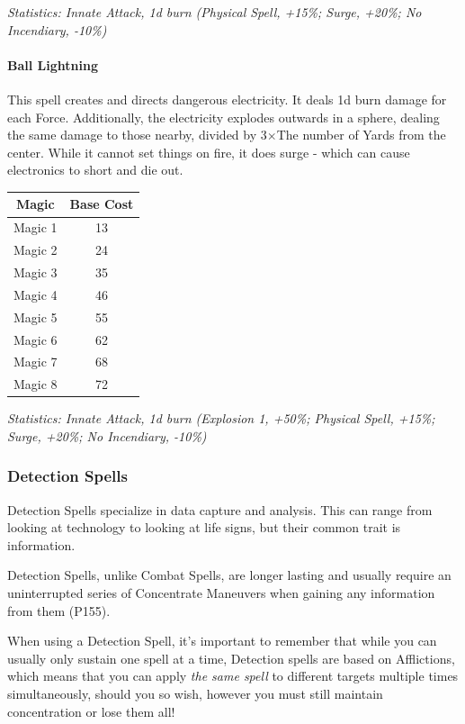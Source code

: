 \begin{multicols}{3}
	\textcolor{OliveGreen}{\textit{Statistics: Innate Attack, 1d burn (Physical Spell, +15\%; Surge, +20\%; No Incendiary, -10\%)}}
	
	\paragraph{Ball Lightning}
	
	This spell creates and directs dangerous electricity. It deals 1d burn damage for each Force. Additionally, the electricity explodes outwards in a sphere, dealing the same damage to those nearby, divided by 3\(\times\)The number of Yards from the center. While it cannot set things on fire, it does surge - which can cause electronics to short and die out.
	
	\begin{center}
		\begin{tabular}{|c|c|}
			\hline
			Magic & Base Cost \\
			\hline
			\hline
			Magic 1 & 13 \\
			Magic 2 & 24 \\
			Magic 3 & 35 \\
			Magic 4 & 46 \\
			Magic 5 & 55 \\
			Magic 6 & 62 \\
			Magic 7 & 68 \\
			Magic 8 & 72 \\
			\hline
		\end{tabular}
	\end{center}
	
	\textcolor{OliveGreen}{\textit{Statistics: Innate Attack, 1d burn (Explosion 1, +50\%; Physical Spell, +15\%; Surge, +20\%; No Incendiary, -10\%)}}
	
	\subsubsection{Detection Spells}
	
	Detection Spells specialize in data capture and analysis. This can range from looking at technology to looking at life signs, but their common trait is information.
	
	Detection Spells, unlike Combat Spells, are longer lasting and usually require an uninterrupted series of Concentrate Maneuvers when gaining any information from them (P155).
	
	When using a Detection Spell, it's important to remember that while you can usually only sustain one spell at a time, Detection spells are based on Afflictions, which means that you can apply \textit{the same spell} to different targets multiple times simultaneously, should you so wish, however you must still maintain concentration or lose them all!
	

\end{multicols}
